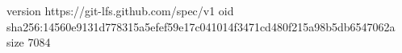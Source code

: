 version https://git-lfs.github.com/spec/v1
oid sha256:14560e9131d778315a5efef59e17c041014f3471cd480f215a98b5db6547062a
size 7084
